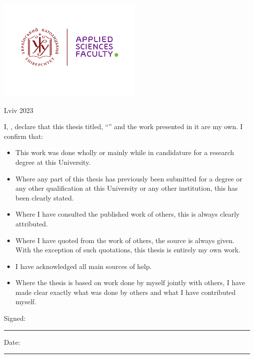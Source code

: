 \documentclass[
11pt, %
oneside, %
english, %
singlespacing, %
headsepline, %
]{BachelorMasterThesis} %
\begin{document}
\begin{titlepage}
\begin{center}
\vfill
\includegraphics[height=5cm]{UCU-Apps.png} %

\vfill
{\large Lviv 2023}\\[4cm] %
 
\vfill
\end{center}
\end{titlepage}


\begin{declaration}
\addchaptertocentry{\authorshipname} %
\noindent I, \authorname, declare that this thesis titled, \enquote{\ttitle} and the work presented in it are my own. I confirm that:

\begin{itemize} 
\item This work was done wholly or mainly while in candidature for a research degree at this University.
\item Where any part of this thesis has previously been submitted for a degree or any other qualification at this University or any other institution, this has been clearly stated.
\item Where I have consulted the published work of others, this is always clearly attributed.
\item Where I have quoted from the work of others, the source is always given. With the exception of such quotations, this thesis is entirely my own work.
\item I have acknowledged all main sources of help.
\item Where the thesis is based on work done by myself jointly with others, I have made clear exactly what was done by others and what I have contributed myself.\\
\end{itemize}
 
\noindent Signed:\\
\rule[0.5em]{25em}{0.5pt} %
 
\noindent Date:\\
\rule[0.5em]{25em}{0.5pt} %
\end{declaration}
\end{document}
